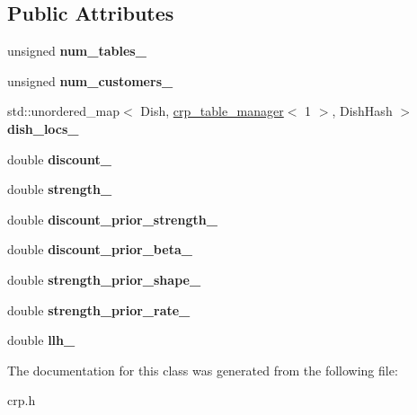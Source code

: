 \subsection*{Public Attributes}
\begin{DoxyCompactItemize}
\item 
\mbox{\label{classcpyp_1_1crp_a08f3f332991a4339902d3bedfd8ef063}} 
unsigned {\bfseries num\+\_\+tables\+\_\+}
\item 
\mbox{\label{classcpyp_1_1crp_af01316f08de4236e81a9bb5242234c60}} 
unsigned {\bfseries num\+\_\+customers\+\_\+}
\item 
\mbox{\label{classcpyp_1_1crp_ab55473a04fae840dca91932667d5aa80}} 
std\+::unordered\+\_\+map$<$ Dish, \mbox{\hyperlink{structcpyp_1_1crp__table__manager}{crp\+\_\+table\+\_\+manager}}$<$ 1 $>$, Dish\+Hash $>$ {\bfseries dish\+\_\+locs\+\_\+}
\item 
\mbox{\label{classcpyp_1_1crp_a0d346bb17d5ded77c56ed15eab7549a3}} 
double {\bfseries discount\+\_\+}
\item 
\mbox{\label{classcpyp_1_1crp_a85464d0e10cec8e1c78f1832857744a7}} 
double {\bfseries strength\+\_\+}
\item 
\mbox{\label{classcpyp_1_1crp_a9061a0cea357f268335232c2ebfd487b}} 
double {\bfseries discount\+\_\+prior\+\_\+strength\+\_\+}
\item 
\mbox{\label{classcpyp_1_1crp_a4569a5c5b5aeed7c97a7ee81ac504178}} 
double {\bfseries discount\+\_\+prior\+\_\+beta\+\_\+}
\item 
\mbox{\label{classcpyp_1_1crp_aec1296844a3dd4587ce4a1285621d837}} 
double {\bfseries strength\+\_\+prior\+\_\+shape\+\_\+}
\item 
\mbox{\label{classcpyp_1_1crp_aef085c97b83d1e4232c0dc5e7149f41a}} 
double {\bfseries strength\+\_\+prior\+\_\+rate\+\_\+}
\item 
\mbox{\label{classcpyp_1_1crp_a40f987dd7d70fd9b21bafa5cc6960c89}} 
double {\bfseries llh\+\_\+}
\end{DoxyCompactItemize}


The documentation for this class was generated from the following file\+:\begin{DoxyCompactItemize}
\item 
crp.\+h\end{DoxyCompactItemize}

